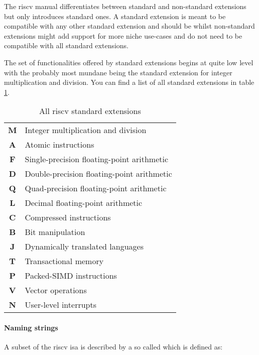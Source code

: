 The \gls{riscv} manual differentiates between standard and non-standard extensions but only introduces standard ones.
A standard extension is meant to be compatible with any other standard extension and should be  whilst non-standard extensions might add support for more niche use-cases and do not need to be compatible with all standard extensions.

The set of functionalities offered by standard extensions begins at quite low level with the probably most mundane being the standard extension for integer multiplication and division.
You can find a list of all standard extensions in table \ref{tbl:rv-exts}.

\begin{table}
    \centering
    \begin{tabular}{| c | l |}
        \hline
        \textbf{M} & Integer multiplication and division \\
        \textbf{A} & Atomic instructions \\
        \textbf{F} & Single-precision floating-point arithmetic \\
        \textbf{D} & Double-precision floating-point arithmetic \\
        \textbf{Q} & Quad-precision floating-point arithmetic \\
        \textbf{L} & Decimal floating-point arithmetic \\
        \textbf{C} & Compressed instructions \\
        \textbf{B} & Bit manipulation \\
        \textbf{J} & Dynamically translated languages \\
        \textbf{T} & Transactional memory \\
        \textbf{P} & Packed-SIMD instructions \\
        \textbf{V} & Vector operations \\
        \textbf{N} & User-level interrupts \\
        \hline
    \end{tabular}
    \caption{All \gls{riscv} standard extensions}
    \label{tbl:rv-exts}
\end{table}

\paragraph{Naming strings}
A subset of the \gls{riscv} \gls{isa} is described by a so called  which is defined as:

